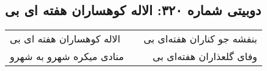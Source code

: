 \begin{center}
\section*{دوبیتی شماره ۳۲۰: الاله کوهساران هفته ای بی}
\label{sec:320}
\begin{longtable}{l p{0.5cm} r}
الاله کوهساران هفته ای بی
&&
بنفشه جو کناران هفته‌ای بی
\\
منادی میکره شهرو به شهرو
&&
وفای گلعذاران هفته‌ای بی
\\
\end{longtable}
\end{center}
